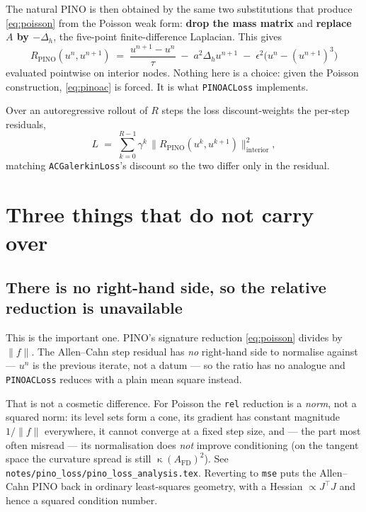 \documentclass[11pt]{article}
\newcommand{\dt}{\tau}
\DeclareMathOperator{\cond}{\kappa}
\begin{document}
The natural PINO is then obtained by the same two substitutions that produce \eqref{eq:poisson}
from the Poisson weak form: \textbf{drop the mass matrix} and \textbf{replace $A$ by
$-\Delta_h$}, the five-point finite-difference Laplacian. This gives
\begin{equation}
  \boxed{\;
  R_{\mathrm{PINO}}(u^{n},u^{n+1}) \;=\; \frac{u^{n+1}-u^{n}}{\dt} \;-\; a^2 \Delta_h u^{n+1}
  \;-\; \epsilon^2\bigl(u^{n} - (u^{n+1})^3\bigr) \; }
  \label{eq:pinoac}
\end{equation}
evaluated pointwise on interior nodes. Nothing here is a choice: given the Poisson construction,
\eqref{eq:pinoac} is forced. It is what \texttt{PINOACLoss} implements.

Over an autoregressive rollout of $R$ steps the loss discount-weights the per-step residuals,
\begin{equation}
  L \;=\; \sum_{k=0}^{R-1} \gamma^{k}\,\bigl\| R_{\mathrm{PINO}}(u^{k},u^{k+1}) \bigr\|^2_{\text{interior}} ,
\end{equation}
matching \texttt{ACGalerkinLoss}'s discount so the two differ only in the residual.

\section{Three things that do not carry over}

\subsection{There is no right-hand side, so the relative reduction is unavailable}

This is the important one. PINO's signature reduction \eqref{eq:poisson} divides by $\|f\|$. The
Allen--Cahn step residual has \emph{no} right-hand side to normalise against --- $u^n$ is the
previous iterate, not a datum --- so the ratio has no analogue and \texttt{PINOACLoss} reduces with
a plain mean square instead.

That is not a cosmetic difference. For Poisson the \texttt{rel} reduction is a \emph{norm}, not a
squared norm: its level sets form a cone, its gradient has constant magnitude $1/\|f\|$ everywhere,
it cannot converge at a fixed step size, and --- the part most often misread --- its normalisation
does \emph{not} improve conditioning (on the tangent space the curvature spread is still
$\cond(A_{\mathrm{FD}})^2$). See \texttt{notes/pino\_loss/pino\_loss\_analysis.tex}. Reverting to
\texttt{mse} puts the Allen--Cahn PINO back in ordinary least-squares geometry, with a Hessian
$\propto J^\top J$ and hence a squared condition number.
\end{document}
